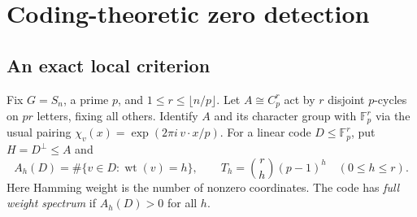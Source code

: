\documentclass[11pt]{article}
\theoremstyle{remark}\newtheorem{remark}[theorem]{Remark}
\newcommand{\wt}{\operatorname{wt}}
\newcommand{\F}{\mathbb F}
\begin{document}
\section{Coding-theoretic zero detection}
\subsection{An exact local criterion}
Fix $G=S_n$, a prime $p$, and $1\le r\le\lfloor n/p\rfloor$. Let $A\cong C_p^r$ act by $r$ disjoint $p$-cycles on $pr$ letters, fixing all others. Identify $A$ and its character group with $\F_p^r$ via the usual pairing $\chi_v(x)=\exp(2\pi i\,v\cdot x/p)$. For a linear code $D\le\F_p^r$, put $H=D^\perp\le A$ and
\[
 A_h(D)=\#\{v\in D:\wt(v)=h\},\qquad T_h=\binom rh(p-1)^h\quad(0\le h\le r).
\]
Here Hamming weight is the number of nonzero coordinates. The code has \emph{full weight spectrum} if $A_h(D)>0$ for all $h$.
\end{document}
